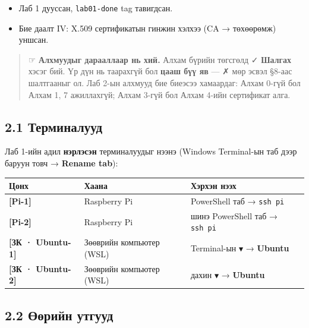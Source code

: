 \begin{itemize}
\tightlist
\item
  Лаб 1 дууссан, \texttt{lab01-done} tag тавигдсан.
\item
  Бие даалт IV: X.509 сертификатын гинжин хэлхээ (CA → төхөөрөмж) уншсан.
\end{itemize}

\begin{quote}
☞ \textbf{Алхмуудыг дарааллаар нь хий.} Алхам бүрийн төгсгөлд ✓ \textbf{Шалгах} хэсэг бий. Үр дүн нь таарахгүй бол \textbf{цааш бүү яв} --- ✗ мөр эсвэл §8-аас шалтгааныг ол. Лаб 2-ын алхмууд бие биеэсээ хамаардаг: Алхам 0-гүй бол Алхам 1, 7 ажиллахгүй; Алхам 3-гүй бол Алхам 4-ийн сертификат алга.
\end{quote}

\hypertarget{ux442ux435ux440ux43cux438ux43dux430ux43bux443ux443ux434}{%
\subsection{2.1 Терминалууд}\label{ux442ux435ux440ux43cux438ux43dux430ux43bux443ux443ux434}}

Лаб 1-ийн адил \textbf{нэрлэсэн} терминалуудыг нээнэ (Windows Terminal-ын таб дээр баруун товч → \textbf{Rename tab}):

\begingroup\scriptsize\begin{longtable}[]{@{}lll@{}}
\toprule
Цонх & Хаана & Хэрхэн нээх\tabularnewline
\midrule
\endhead
\textbf{{[}Pi-1{]}} & Raspberry Pi & PowerShell таб → \texttt{ssh\ pi}\tabularnewline
\textbf{{[}Pi-2{]}} & Raspberry Pi & шинэ PowerShell таб → \texttt{ssh\ pi}\tabularnewline
\textbf{{[}ЗК · Ubuntu-1{]}} & Зөөврийн компьютер (WSL) & Terminal-ын \texttt{▼} → \textbf{Ubuntu}\tabularnewline
\textbf{{[}ЗК · Ubuntu-2{]}} & Зөөврийн компьютер (WSL) & дахин \texttt{▼} → \textbf{Ubuntu}\tabularnewline
\bottomrule
\end{longtable}\endgroup

\hypertarget{ux4e9ux4e9ux440ux438ux439ux43d-ux443ux442ux433ux443ux443ux434}{%
\subsection{2.2 Өөрийн утгууд}\label{ux4e9ux4e9ux440ux438ux439ux43d-ux443ux442ux433ux443ux443ux434}}


